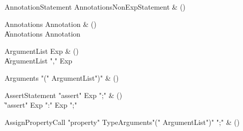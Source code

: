 \begin{bbgrammar}

AnnotationStatement \label{prod:AnnotationStatement}  \: Annotations\opt NonExpStatement & () \\


\end{bbgrammar}

\begin{bbgrammar}

Annotations \label{prod:Annotations}  \: Annotation & () \\

    \| Annotations Annotation \\

\end{bbgrammar}

\begin{bbgrammar}

ArgumentList \label{prod:ArgumentList}  \: Exp & () \\

    \| ArgumentList \xcd"," Exp \\

\end{bbgrammar}

\begin{bbgrammar}

Arguments \label{prod:Arguments}  \: \xcd"(" ArgumentList\opt \xcd")" & () \\


\end{bbgrammar}

\begin{bbgrammar}

AssertStatement \label{prod:AssertStatement}  \: \xcd"assert" Exp \xcd";" & () \\

    \| \xcd"assert" Exp  \xcd":" Exp  \xcd";" \\

\end{bbgrammar}

\begin{bbgrammar}

AssignPropertyCall \label{prod:AssignPropertyCall}  \: \xcd"property" TypeArguments\opt \xcd"(" ArgumentList\opt \xcd")" \xcd";" & () \\


\end{bbgrammar}

